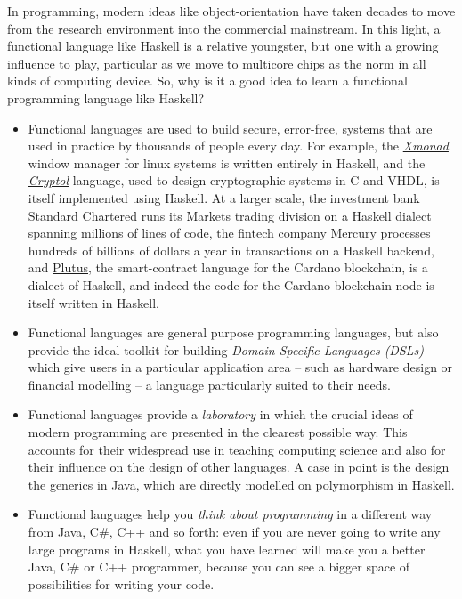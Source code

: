 In programming, modern ideas like object-orientation have
taken decades to move from the research environment into the commercial mainstream.
In this light, a functional language like Haskell is a relative
youngster, but one with a growing influence to play, particular as we move to multicore chips as the norm in all kinds of computing device.
So, why is it a good idea to learn a functional programming language like Haskell?
\begin{itemize}
\item 
Functional languages are used to build secure, error-free, systems that are used in practice by thousands of people every day. For example, the \href{https://xmonad.org}{\emph{Xmonad}} window manager for linux systems is written entirely in Haskell, and the \href{https://github.com/GaloisInc/cryptol}{\emph{Cryptol}} language, used to design cryptographic systems in C and VHDL, is itself implemented using Haskell. At a larger scale, the investment bank Standard Chartered runs its Markets trading division on a Haskell dialect spanning millions of lines of code, the fintech company Mercury processes hundreds of billions of dollars a year in transactions on a Haskell backend, and \href{https://docs.cardano.org/developer-resources/smart-contracts/plutus}{Plutus}, the smart-contract language for the Cardano blockchain, is a dialect of Haskell, and indeed the code for the Cardano blockchain node is itself written in Haskell.
\item
Functional languages are general purpose programming languages, but also provide the ideal toolkit for building \emph{Domain Specific Languages (DSLs)} which give users in a particular application area -- such as hardware design or financial modelling -- a language particularly suited to their needs.
\item
Functional languages provide a \emph{laboratory} in which the crucial ideas of
modern programming are presented in the clearest possible way. This
accounts for their widespread use in teaching computing science and
also for their influence on the design of other languages. A case in
point is the design the generics in Java, which are directly
modelled on polymorphism in Haskell.
\item
Functional languages help you \emph{think about programming} in a different way from Java, C\#, C++ and so forth: even if you are never going to write any large programs in Haskell, what you have learned will make you a better Java, C\# or C++ programmer, because you can see a bigger space of possibilities for writing your code.

\end{itemize}
